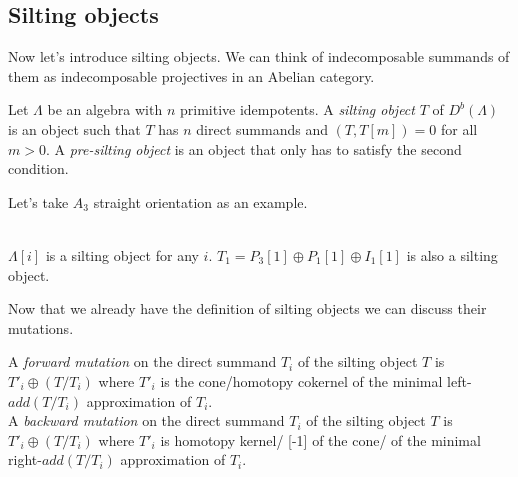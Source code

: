 \subsection{Silting objects}
\indent Now let's introduce silting objects. We can think of indecomposable summands of them as indecomposable projectives in an Abelian category.\\
\begin{definition}
Let $\Lambda$ be an algebra with $n$ primitive idempotents. A \textit{silting object} $T$ of $D^b(\Lambda)$ is an object such that $T$ has $n$ direct summands and $(T,T[m])=0$ for all $m>0$. A \textit{pre-silting object} is an object that only has to satisfy the second condition.\\
\end{definition}
\begin{example}
\indent Let's take $A_3$ straight orientation as an example.\\
\\
\indent $\Lambda[i]$ is a silting object for any $i$. $T_1=P_3[1]\oplus P_1[1] \oplus I_1[1]$ is also a silting object.
\end{example}
\indent Now that we already have the definition of silting objects we can discuss their mutations.\\
\begin{definition}
A \textit{forward mutation} on the direct summand $T_i$ of the silting object $T$ is $T'_i\oplus (T/T_i)$ where $T'_i$ is the cone/homotopy cokernel of the minimal left-$add (T/T_i)$ approximation of $T_i$.\\
A \textit{backward mutation} on the direct summand $T_i$ of the silting object $T$ is $T'_i\oplus (T/T_i)$ where $T'_i$ is homotopy kernel/ [-1] of the cone/ of the minimal right-$add (T/T_i)$ approximation of $T_i$.
\end{definition}
